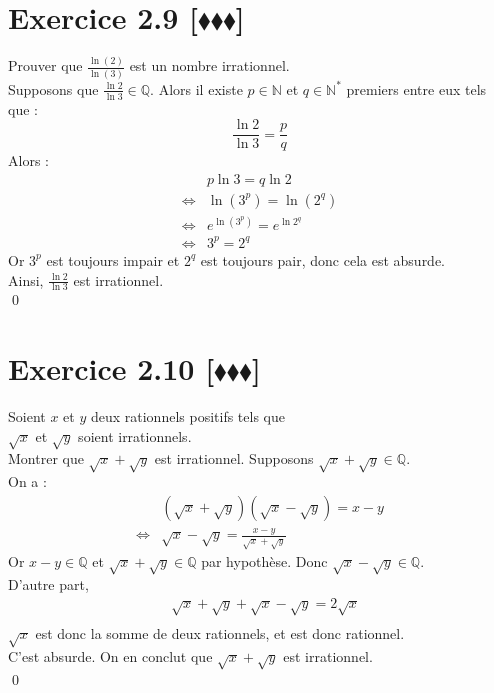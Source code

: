 \documentclass[10pt]{article}
\begin{document}
\section*{Exercice 2.9 [$\blacklozenge\blacklozenge\blacklozenge$]}
\begin{tcolorbox}[enhanced, width=7in, center, size=fbox, fontupper=\large, drop shadow southwest]
    Prouver que $\frac{\ln(2)}{\ln(3)}$ est un nombre irrationnel.\\
    Supposons que $\frac{\ln{2}}{\ln{3}}\in\mathbb{Q}$. Alors il existe $p\in\mathbb{N}$ et $q\in\mathbb{N}^*$ premiers entre eux tels que :
    \begin{equation*}
        \frac{\ln{2}}{\ln{3}}=\frac{p}{q}
    \end{equation*}
    Alors :
    \begin{align*}
        &p\ln{3}=q\ln{2}\\
        \iff&\ln(3^p)=\ln(2^q)\\
        \iff&e^{\ln(3^p)}=e^{\ln{2^q}}\\
        \iff&3^p=2^q
    \end{align*}
    Or $3^p$ est toujours impair et $2^q$ est toujours pair, donc cela est absurde.\\
    Ainsi, $\frac{\ln2}{\ln3}$ est irrationnel.\\
    \qed
\end{tcolorbox}

\section*{Exercice 2.10 [$\blacklozenge\blacklozenge\blacklozenge$]}
\begin{tcolorbox}[enhanced, width=7in, center, size=fbox, fontupper=\large, drop shadow southwest]
    Soient $x$ et $y$ deux rationnels positifs tels que \\$\sqrt{x}$ et $\sqrt{y}$ soient irrationnels.\\
    Montrer que $\sqrt{x} + \sqrt{y}$ est irrationnel.
    Supposons $\sqrt{x}+\sqrt{y}\in\mathbb{Q}$.\\
    On a :
    \begin{align*}
        &(\sqrt{x}+\sqrt{y})(\sqrt{x}-\sqrt{y})=x-y\\
        \iff&\sqrt{x}-\sqrt{y}=\frac{x-y}{\sqrt{x}+\sqrt{y}}
    \end{align*}
    Or $x-y\in\mathbb{Q}$ et $\sqrt{x}+\sqrt{y}\in\mathbb{Q}$ par hypothèse. Donc $\sqrt{x}-\sqrt{y}\in\mathbb{Q}$.\\
    D'autre part,
    \begin{align*}
        &\sqrt{x}+\sqrt{y}+\sqrt{x}-\sqrt{y}=2\sqrt{x}\\
    \end{align*}
    $\sqrt{x}$ est donc la somme de deux rationnels, et est donc rationnel.\\
    C'est absurde. On en conclut que $\sqrt{x}+\sqrt{y}$ est irrationnel.\\
    \qed
\end{tcolorbox}
\end{document}
